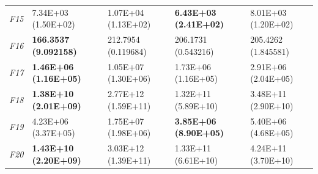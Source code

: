 \begin{table}[!h]
\begin{center}
\begin{tabular}{p{0.5cm}|p{2.5cm}|p{2.5cm}|p{2.5cm}|p{2.5cm}}
\textit{F15}& 7.34E+03 (1.50E+02) & 1.07E+04 (1.13E+02) & \textbf{6.43E+03 (2.41E+02)} & 8.01E+03 (1.20E+02)\\
\textit{F16}& \textbf{166.3537 (9.092158)} & 212.7954 (0.119684) & 206.1731 (0.543216) & 205.4262 (1.845581)\\
\textit{F17}& \textbf{1.46E+06 (1.16E+05)} & 1.05E+07 (1.30E+06) & 1.73E+06 (1.16E+05) & 2.91E+06 (2.04E+05)\\
\textit{F18}& \textbf{1.38E+10 (2.01E+09)} & 2.77E+12 (1.59E+11) & 1.32E+11 (5.89E+10) & 3.48E+11 (2.90E+10)\\
\textit{F19}& 4.23E+06 (3.37E+05) & 1.75E+07 (1.98E+06) & \textbf{3.85E+06 (8.90E+05)} & 5.40E+06 (4.68E+05)\\
\textit{F20}& \textbf{1.43E+10 (2.20E+09)} & 3.03E+12 (1.39E+11) & 1.33E+11 (6.61E+10) & 4.24E+11 (3.70E+10)\\
\hline
\end{tabular}
\end{center}
\end{table}

